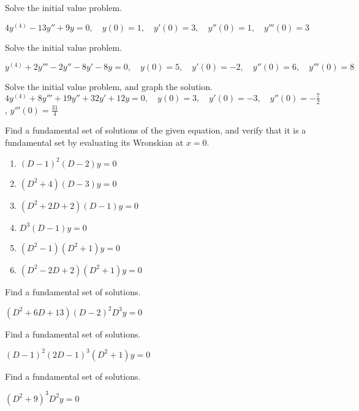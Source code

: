 \documentclass{ximera}
\begin{document}
\begin{problem}\label{exer:9.2.25}  Solve the
initial value problem.

$4y^{(4)}-13y''+9y=0, \quad  y(0)=1,\quad y'(0)=3,\quad y''(0)=1,\quad y'''(0)=3$
\end{problem}

\begin{problem}\label{exer:9.2.26}  Solve the
initial value problem.

$y^{(4)}+2y'''-2y''-8y'-8y=0, \quad  y(0)=5,\quad y'(0)=-2,\quad y''(0)=6,\quad y'''(0)=8$
\end{problem}

\begin{problem}\label{exer:9.2.27}  Solve the
initial value problem, and graph the solution.
$4y^{(4)}+8y'''+19y''+32y'+12y=0, \quad  y(0)=3,\quad y'(0)=-3,\quad y''(0)=
-\frac{7}{2}$,
 $y'''(0)=\frac{31}{4}$
\end{problem}

\begin{problem}\label{exer:9.2.28}
Find a fundamental set of solutions of the given equation, and verify that it is a fundamental set by evaluating its Wronskian at $x=0$.

\begin{enumerate}
    \item $(D-1)^2(D-2)y=0$
    \item $(D^2+4)(D-3)y=0$
    \item $(D^2+2D+2)(D-1)y=0$
    \item $D^3(D-1)y=0$
    \item $(D^2-1)(D^2+1)y=0$
    \item $(D^2-2D+2)(D^2+1)y=0$
\end{enumerate}
\end{problem}

\begin{problem}\label{exer:9.2.29} Find a
fundamental set of solutions.

$(D^2+6D+13)(D-2)^2D^3y=0$
\end{problem}

\begin{problem}\label{exer:9.2.30} Find a
fundamental set of solutions.

$(D-1)^2(2D-1)^3(D^2+1)y=0$
\end{problem}

\begin{problem}\label{exer:9.2.31} Find a
fundamental set of solutions.

$(D^2+9)^3D^2y=0$
\end{problem}
\end{document}
